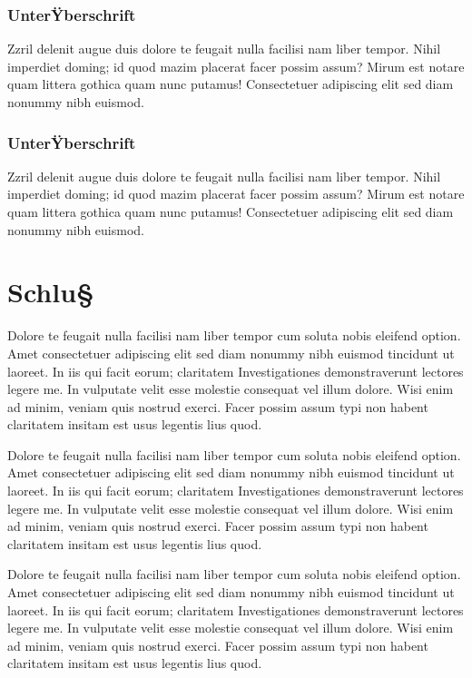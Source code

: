 \documentclass[a4paper,12pt]{scrartcl}
\begin{document}
\subsubsection{UnterŸberschrift}
Zzril delenit augue duis dolore te feugait nulla facilisi nam liber tempor. Nihil imperdiet doming; id quod mazim placerat facer possim assum? Mirum est notare quam littera gothica quam nunc putamus! Consectetuer adipiscing elit sed diam nonummy nibh euismod.

\subsubsection{UnterŸberschrift}
Zzril delenit augue duis dolore te feugait nulla facilisi nam liber tempor. Nihil imperdiet doming; id quod mazim placerat facer possim assum? Mirum est notare quam littera gothica quam nunc putamus! Consectetuer adipiscing elit sed diam nonummy nibh euismod.

\section{Schlu§}
Dolore te feugait nulla facilisi nam liber tempor cum soluta nobis eleifend option. Amet consectetuer adipiscing elit sed diam nonummy nibh euismod tincidunt ut laoreet. In iis qui facit eorum; claritatem Investigationes demonstraverunt lectores legere me. In vulputate velit esse molestie consequat vel illum dolore. Wisi enim ad minim, veniam quis nostrud exerci. Facer possim assum typi non habent claritatem insitam est usus legentis lius quod.

Dolore te feugait nulla facilisi nam liber tempor cum soluta nobis eleifend option. Amet consectetuer adipiscing elit sed diam nonummy nibh euismod tincidunt ut laoreet. In iis qui facit eorum; claritatem Investigationes demonstraverunt lectores legere me. In vulputate velit esse molestie consequat vel illum dolore. Wisi enim ad minim, veniam quis nostrud exerci. Facer possim assum typi non habent claritatem insitam est usus legentis lius quod.

Dolore te feugait nulla facilisi nam liber tempor cum soluta nobis eleifend option. Amet consectetuer adipiscing elit sed diam nonummy nibh euismod tincidunt ut laoreet. In iis qui facit eorum; claritatem Investigationes demonstraverunt lectores legere me. In vulputate velit esse molestie consequat vel illum dolore. Wisi enim ad minim, veniam quis nostrud exerci. Facer possim assum typi non habent claritatem insitam est usus legentis lius quod.
\end{document}
